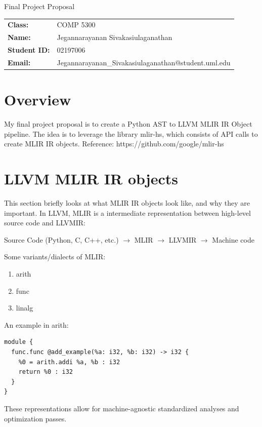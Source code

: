 \documentclass[11pt]{article}
\begin{document}
\begin{center}
    {\LARGE Final Project Proposal}\\[1.5em]
\end{center}

\begin{tabular}{@{}ll@{}}
    \textbf{Class:} & COMP 5300 \\[0.5em]
    \textbf{Name:} & Jegannarayanan Sivakasiulaganathan \\[0.5em]
    \textbf{Student ID:} & 02197006 \\[0.5em]
    \textbf{Email:} & Jegannarayanan\_Sivakasiulaganathan@student.uml.edu
\end{tabular}

\vspace{2em}

\section{Overview}
My final project proposal is to create a Python AST to LLVM MLIR IR Object
pipeline. The idea is to leverage the library mlir-hs, which consists of
API calls to create MLIR IR objects.
Reference:
https://github.com/google/mlir-hs

\section{LLVM MLIR IR objects}
This section briefly looks at what MLIR IR objects look like, and why they are important.
In LLVM, MLIR is a intermediate representation between high-level source code and LLVMIR:

\noindent Source Code (Python, C, C++, etc.) $\to$ MLIR $\to$ LLVMIR $\to$ Machine code

\noindent Some variants/dialects of MLIR:

\begin{enumerate}
    \item arith
    \item func
    \item linalg
\end{enumerate}

\noindent An example in arith:
\begin{verbatim}
module {
  func.func @add_example(%a: i32, %b: i32) -> i32 {
    %0 = arith.addi %a, %b : i32
    return %0 : i32
  }
}
\end{verbatim}

These representations allow for machine-agnostic standardized analyses and optimization passes.
\end{document}
